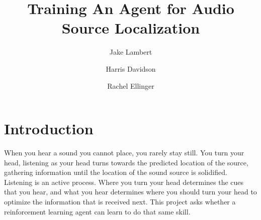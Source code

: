 \documentclass{article}
\title{Training An Agent for Audio Source Localization}
\author{Jake Lambert \and Harris Davidson \and Rachel Ellinger}
\date{\vspace{-1em}}
\begin{document}
\maketitle


\section{Introduction}


When you hear a sound you cannot place, you rarely stay still. You turn your head, listening as your head turns towards the predicted location of the source, gathering information until the location of the sound source is solidified. Listening is an active process. Where you turn your head determines the cues that you hear, and what you hear determines where you should turn your head to optimize the information that is received next. This project asks whether a reinforcement learning agent can learn to do that same skill.
\end{document}
